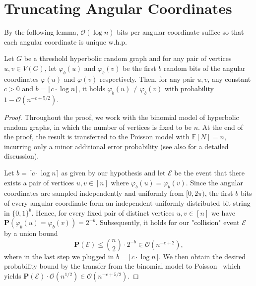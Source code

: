 \documentclass[letterpaper,11pt]{article}
\newcommand{\Prob}[1]{\mathbf{P}\left(#1\right)}
\newcommand{\whp}{w.h.p.\xspace}
\newcommand{\1}{\mathbb I}
\newcommand{\bigO}{\mathcal{O}}
\begin{document}
\section{Truncating Angular Coordinates}
%
By the following lemma, $\bigO(\log n)$ bits per angular coordinate suffice so that each angular coordinate is unique \whp
%
\begin{lemma}\label{lem:truncation}
    Let $G$ be a threshold hyperbolic random graph and for any pair of vertices $u,v \in V(G)$, let $\varphi_b(u)$ and $\varphi_b(v)$ be the first $b$ random bits of the angular coordinates $\varphi(u)$ and $\varphi(v)$ respectively. Then, for any pair $u,v$, any constant $c > 0$ and $b = \lceil c\cdot \log n \rceil$, it holds $\varphi_b(u) \neq \varphi_b(v) $ with probability $1 - \bigO(n^{-c+5/2})$.
\end{lemma}
%
\begin{proof}
    Throughout the proof, we work with the binomial model of hyperbolic random graphs, in which the number of vertices is fixed to be $n$. At the end of the proof, the result is transferred to the Poisson model with $\mathbb{E}[N]=n$, incurring only a minor additional error probability (see also \cite[\S 3.3.4, Lemma 3.9]{katz-diss-23} for a detailed discussion).

Let $b = \lceil c\cdot \log n \rceil$ as given by our hypothesis and let $\mathcal{E}$ be the event that there exists a pair of vertices $u,v \in [n]$ where  $\varphi_b(u) = \varphi_b(v)$. Since the angular coordinates are sampled independently and uniformly from $[0,2\pi)$, the first $b$ bits of every angular coordinate form an independent uniformly distributed bit string in $\{0,1\}^b$. Hence, for every fixed pair of distinct vertices $u,v \in [n]$ we have $\Prob{\varphi_b(u)=\varphi_b(v)} = 2^{-b}$. Subsequently, it holds for our "collision" event $\mathcal{E}$ by a union bound
%
$$
\Prob{\mathcal{E}} \leq {n\choose 2}\cdot 2^{-b}\in\bigO(n^{-c+2}),
$$
%
where in the last step we plugged in $b = \lceil c\cdot \log n \rceil$. We then obtain the desired probability bound by the transfer from the binomial model to Poisson~\cite[Lemma 3.9]{katz-diss-23} which yields $\Prob{\mathcal{E}}\cdot\bigO(n^{1/2}) \in \bigO(n^{-c+5/2})$.
\end{proof}
\end{document}
